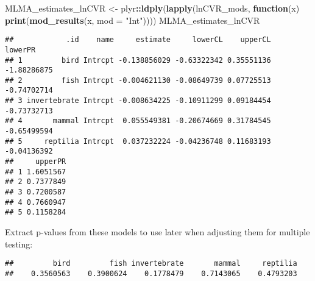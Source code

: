 \documentclass[]{article}
\newenvironment{Shaded}{\begin{snugshade}}{\end{snugshade}}
\newcommand{\KeywordTok}[1]{\textcolor[rgb]{0.13,0.29,0.53}{\textbf{#1}}}
\newcommand{\DataTypeTok}[1]{\textcolor[rgb]{0.13,0.29,0.53}{#1}}
\newcommand{\StringTok}[1]{\textcolor[rgb]{0.31,0.60,0.02}{#1}}
\newcommand{\CommentTok}[1]{\textcolor[rgb]{0.56,0.35,0.01}{\textit{#1}}}
\newcommand{\ControlFlowTok}[1]{\textcolor[rgb]{0.13,0.29,0.53}{\textbf{#1}}}
\newcommand{\OperatorTok}[1]{\textcolor[rgb]{0.81,0.36,0.00}{\textbf{#1}}}
\newcommand{\NormalTok}[1]{#1}
\begin{document}
\begin{Shaded}
\begin{Highlighting}[]
\NormalTok{  MLMA_estimates_lnCVR <-}\StringTok{ }\NormalTok{plyr}\OperatorTok{::}\KeywordTok{ldply}\NormalTok{(}\KeywordTok{lapply}\NormalTok{(lnCVR_mods, }\ControlFlowTok{function}\NormalTok{(x) }\KeywordTok{print}\NormalTok{(}\KeywordTok{mod_results}\NormalTok{(x, }\DataTypeTok{mod =} \StringTok{"Int"}\NormalTok{))))}
\NormalTok{      MLMA_estimates_lnCVR}
\end{Highlighting}
\end{Shaded}

\begin{verbatim}
##            .id    name     estimate     lowerCL    upperCL     lowerPR
## 1         bird Intrcpt -0.138856029 -0.63322342 0.35551136 -1.88286875
## 2         fish Intrcpt -0.004621130 -0.08649739 0.07725513 -0.74702714
## 3 invertebrate Intrcpt -0.008634225 -0.10911299 0.09184454 -0.73732713
## 4       mammal Intrcpt  0.055549381 -0.20674669 0.31784545 -0.65499594
## 5     reptilia Intrcpt  0.037232224 -0.04236748 0.11683193 -0.04136392
##     upperPR
## 1 1.6051567
## 2 0.7377849
## 3 0.7200587
## 4 0.7660947
## 5 0.1158284
\end{verbatim}

Extract p-values from these models to use later when adjusting them for
multiple testing:

\begin{Shaded}
\end{Shaded}

\begin{verbatim}
##         bird         fish invertebrate       mammal     reptilia 
##    0.3560563    0.3900624    0.1778479    0.7143065    0.4793203
\end{verbatim}

\begin{Shaded}
\end{Shaded}
\end{document}
